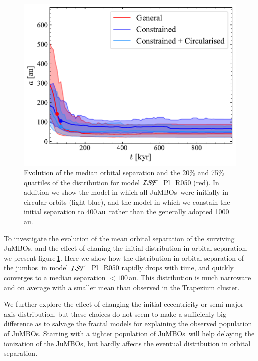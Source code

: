 \documentclass[submission,phys]{lib/SciPost}
\newcommand{\jumbos}{\mbox{JuMBOs}}
\begin{document}
\begin{figure}
    \centering
        \includegraphics[width=\columnwidth]{figures/Fractal_noFF_sem_evol.pdf}
        \caption{Evolution of the median orbital separation and the
          20\% and 75\% quartiles of the distribution for model ${\cal
            ISF}$\_Pl\_R050 (red).  In addition we show the model in
          which all \jumbos\, were initially in circular orbits (light
          blue), and the model in which we constain the initial
          separation to 400\,au\, rather than the generally adopted
          1000\,au. }
        \label{Fig:sma_vs_time_model_ISF_Fr}
   \end{figure}

To investigate the evolution of the mean orbital separation of the
surviving \jumbos, and the effect of chaning the initial distribution
in orbital separation, we present
figure\,\ref{Fig:sma_vs_time_model_ISF_Fr}. Here we show how the
distribution in orbital separation of the jumbos\, in model ${\cal
  ISF}$\_Pl\_R050 rapidly drops with time, and quickly converges to a
median separation $<100$\,au. This distribution is much narroware and
on average with a smaller mean than observed in the Trapezium
cluster.

We further explore the effect of changing the initial eccentricity or
semi-major axis distribution, but these choices do not seem to make a
sufficienly big difference as to salvage the fractal models for
explaining the observed population of \jumbos.  Starting with a
tighter population of \jumbos\, will help delaying the ionization of
the \jumbos, but hardly affects the eventual distribution in orbital
separation.
\end{document}
